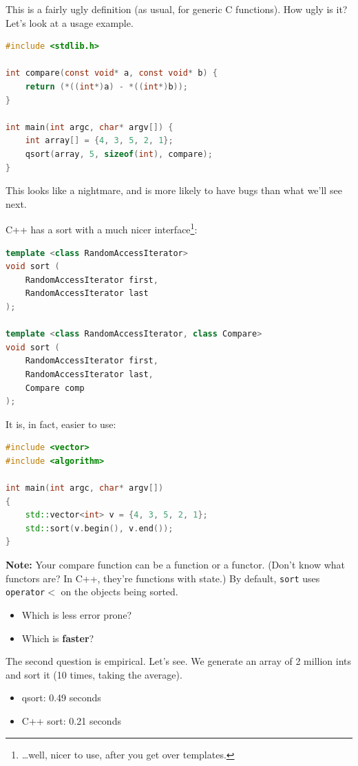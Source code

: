 \documentclass[a4paper]{report}
\begin{document}
This is a fairly ugly definition (as usual, for generic C functions). How ugly is it?
Let's look at a usage example.
  \begin{lstlisting}[language=C]
#include <stdlib.h>

int compare(const void* a, const void* b) {
    return (*((int*)a) - *((int*)b));
}

int main(int argc, char* argv[]) {
    int array[] = {4, 3, 5, 2, 1};
    qsort(array, 5, sizeof(int), compare);
}
  \end{lstlisting}
This looks like a nightmare, and is more likely to have bugs than what we'll see next.


C++ has a sort with a much nicer interface\footnote{\ldots well, nicer to use, after you get over templates.}:

  \begin{lstlisting}[language=C++]
template <class RandomAccessIterator>
void sort (
    RandomAccessIterator first,
    RandomAccessIterator last
);

template <class RandomAccessIterator, class Compare>
void sort (
    RandomAccessIterator first,
    RandomAccessIterator last,
    Compare comp
);
  \end{lstlisting}
It is, in fact, easier to use:
  \begin{lstlisting}[language=C++]
#include <vector>
#include <algorithm>

int main(int argc, char* argv[])
{
    std::vector<int> v = {4, 3, 5, 2, 1};
    std::sort(v.begin(), v.end());
}
  \end{lstlisting}

{\bf Note:} Your compare function can be a function or a functor. (Don't know what functors
are? In C++, they're functions with state.) By default,
  {\tt sort} uses {\tt operator$<$} on the objects being sorted.

  \begin{itemize}
    \item Which is less error prone?
    \item Which is {\bf faster}?
  \end{itemize}

The second question is empirical. Let's see. We generate an array of 2 million ints
and sort it (10 times, taking the average).

\begin{itemize}
\item qsort: 0.49 seconds
\item C++ sort: 0.21 seconds
\end{itemize}
\end{document}
